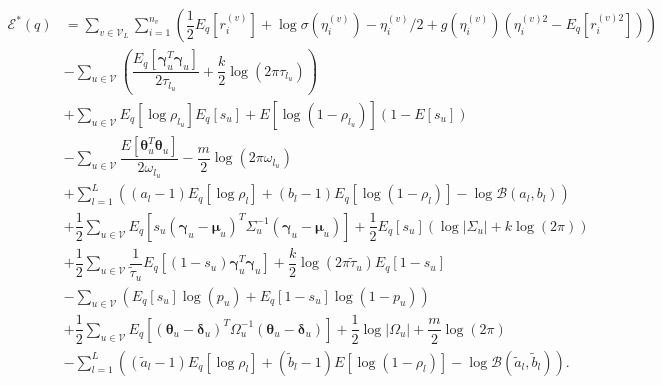 \documentclass[]{article}
\begin{document}
\begin{align}
\mathcal{E}^*(q) & =  \sum_{v \in \mathcal{V}_L} \sum_{i = 1}^{n_v} \left( \dfrac{1}{2}E_q \left[ r_i^{(v)} \right] + \log \sigma\left(\eta_i^{(v)}\right) - \eta_i^{(v)} / 2 + g\left(\eta_i^{(v)}\right) \left(\eta_i^{(v)2} - E_q \left[r_i^{(v)2} \right]  \right) \right) \tag{1} \\
& - \sum_{u \in \mathcal{V}}\left( \dfrac{E_q \left[\boldsymbol{\gamma}_u^T\boldsymbol{\gamma}_u \right]}{2\tau_{l_u}} + \dfrac{k}{2} \log(2 \pi \tau_{l_u})\right)  \tag{2} \\
& +  \sum_{u \in \mathcal{V}} E_q \left[ \log \rho_{l_u} \right]  E_q \left[ s_u \right]  + E \left[ \log \left(1 - \rho_{l_u} \right) \right] \left(1-E \left[s_u\right] \right)   \tag{3} \\
& - \sum_{u \in \mathcal{V}} \dfrac{E \left[\boldsymbol{\theta}_u^T \boldsymbol{\theta}_u \right]}{2 \omega_{l_u}} - \dfrac{m}{2} \log (2 \pi \omega_{l_u})  \tag{4} \\
& + \sum_{l = 1}^L \left((a_l - 1) E_q \left[\log \rho_l \right] + (b_l - 1) E_q \left[\log (1 - \rho_l) \right] - \log \mathcal{B} (a_l, b_l) \right)  \tag{5} \\
& + \dfrac{1}{2} \sum_{u \in \mathcal{V}} E_q\left[s_u \left(\boldsymbol{\gamma}_u - \boldsymbol{\mu}_u \right)^T \Sigma_u^{-1} \left(\boldsymbol{\gamma}_u - \boldsymbol{\mu}_u \right) \right] + \dfrac{1}{2} E_q\left[ s_u \right] \left( \log \left\vert \Sigma_u \right\vert + k \log (2\pi)\right)  \tag{6} \\
& + \dfrac{1}{2} \sum_{u \in \mathcal{V}} \dfrac{1}{\tilde{\tau}_u} E_q\left[(1-s_u) \boldsymbol{\gamma}_u^T \boldsymbol{\gamma}_u \right] +  \dfrac{k}{2} \log (2\pi \tilde{\tau}_u) E_q\left[ 1-s_u \right]  \tag{7} \\
& - \sum_{u \in \mathcal{V}} \left( E_q[s_u] \log(p_u) + E_q[1-s_u] \log \left( 1- p_u \right) \right)  \tag{8} \\ 
& + \dfrac{1}{2} \sum_{u \in \mathcal{V}} E_q \left[ \left(\boldsymbol{\theta}_u - \boldsymbol{\delta}_u \right)^T \Omega_u^{-1} \left(\boldsymbol{\theta}_u - \boldsymbol{\delta}_u \right) \right] +  \dfrac{1}{2} \log \left\vert \Omega_u \right\vert + \dfrac{m}{2} \log(2 \pi)  \tag{9} \\
& - \sum_{l = 1}^L \left((\tilde{a}_l - 1) E_q \left[\log \rho_l \right] + (\tilde{b}_l - 1) E \left[\log (1 - \rho_l) \right] - \log \mathcal{B} (\tilde{a}_l, \tilde{b}_l) \right).  \tag{10}
\end{align}
\end{document}
